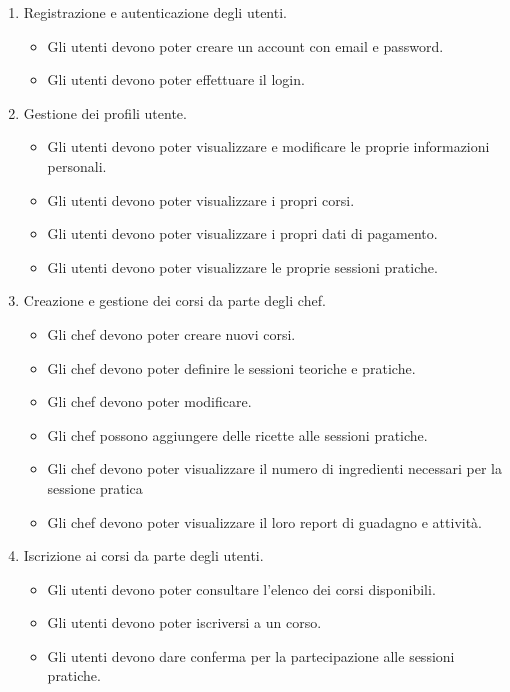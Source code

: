 \begin{enumerate}
    \item Registrazione e autenticazione degli utenti.
    \begin{itemize}
        \item Gli utenti devono poter creare un account con email e password.
        \item Gli utenti devono poter effettuare il login.
    \end{itemize}

    \item Gestione dei profili utente.
    \begin{itemize}
        \item Gli utenti devono poter visualizzare e modificare le proprie informazioni personali.
        \item Gli utenti devono poter visualizzare i propri corsi.
        \item Gli utenti devono poter visualizzare i propri dati di pagamento.
        \item Gli utenti devono poter visualizzare le proprie sessioni pratiche.
    \end{itemize}

    \item Creazione e gestione dei corsi da parte degli chef.
    \begin{itemize}
        \item Gli chef devono poter creare nuovi corsi.
        \item Gli chef devono poter definire le sessioni teoriche e pratiche.
        \item Gli chef devono poter modificare.
        \item Gli chef possono aggiungere delle ricette alle sessioni pratiche.
        \item Gli chef devono poter visualizzare il numero di ingredienti necessari per la sessione pratica
        \item Gli chef devono poter visualizzare il loro report di guadagno e attività.
    \end{itemize}

    \item Iscrizione ai corsi da parte degli utenti.
    \begin{itemize}
        \item Gli utenti devono poter consultare l’elenco dei corsi disponibili.
        \item Gli utenti devono poter iscriversi a un corso.
        \item Gli utenti devono dare conferma per la partecipazione alle sessioni pratiche.
    \end{itemize}


\end{enumerate}
